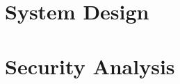 \documentclass[12pt]{article}
\begin{document}
\maketitle

\section{System Design}
\section{Security Analysis}
\end{document}
